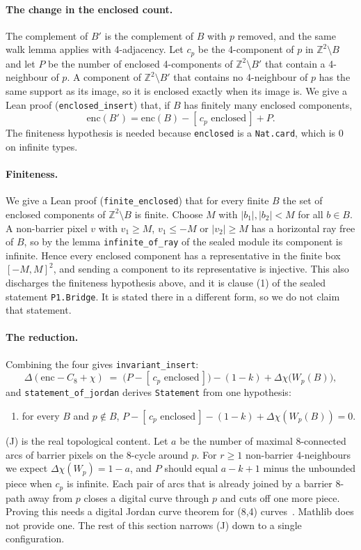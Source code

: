 \documentclass[11pt]{article}
\theoremstyle{definition}
\theoremstyle{remark}
\begin{document}
\paragraph{The change in the enclosed count.} The complement of $B'$ is the
complement of $B$ with $p$ removed, and the same walk lemma applies with
4-adjacency. Let $c_p$ be the 4-component of $p$ in $\mathbb{Z}^2\setminus B$ and
let $P$ be the number of enclosed 4-components of $\mathbb{Z}^2\setminus B'$ that
contain a 4-neighbour of $p$. A component of $\mathbb{Z}^2\setminus B'$ that
contains no 4-neighbour of $p$ has the same support as its image, so it is enclosed exactly
when its image is. We give a Lean proof (\texttt{enclosed\_insert}) that, if $B$ has finitely many enclosed
components,
\[
  \mathrm{enc}(B') = \mathrm{enc}(B) - [\,c_p \text{ enclosed}\,] + P .
\]
The finiteness hypothesis is needed because \texttt{enclosed} is a
\texttt{Nat.card}, which is $0$ on infinite types.

\paragraph{Finiteness.} We give a Lean proof (\texttt{finite\_enclosed}) that for every finite $B$
the set of enclosed components of $\mathbb{Z}^2\setminus B$ is finite. Choose
$M$ with $|b_1|,|b_2|<M$ for all $b\in B$. A non-barrier pixel $v$ with
$v_1\ge M$, $v_1\le -M$ or $|v_2|\ge M$ has a horizontal ray free of $B$, so by the
lemma \texttt{infinite\_of\_ray} of the sealed module its component is infinite.
Hence every enclosed component has a representative in the finite box
$[-M,M]^2$, and sending a component to its representative is injective. This also
discharges the finiteness hypothesis above, and it is clause (1) of the sealed
statement \texttt{P1.Bridge}. It is stated there in a different form, so we do
not claim that statement.

\paragraph{The reduction.} Combining the four gives \texttt{invariant\_insert}:
\[
  \Delta(\mathrm{enc}-C_8+\chi) \;=\; \bigl(P - [\,c_p\text{ enclosed}\,]\bigr) - (1-k)
  + \Delta\chi\bigl(W_p(B)\bigr),
\]
and \texttt{statement\_of\_jordan} derives \texttt{Statement} from one hypothesis:
\begin{enumerate}
\item[(J)] for every $B$ and $p\notin B$,
  $P - [\,c_p\text{ enclosed}\,] - (1-k) + \Delta\chi(W_p(B)) = 0$.
\end{enumerate}
(J) is the real topological content. Let $a$ be the number of
maximal 8-connected arcs of barrier pixels on the 8-cycle around $p$. For
$r\ge1$ non-barrier 4-neighbours we expect $\Delta\chi(W_p)=1-a$, and $P$ should
equal $a-k+1$ minus the unbounded piece when $c_p$ is infinite. Each pair of arcs that is
already joined by a barrier 8-path away from $p$ closes a digital curve through $p$
and cuts off one more piece. Proving this needs a digital Jordan curve theorem for
(8,4) curves~\cite{Rosenfeld1970}. Mathlib does not provide one. The rest of this section
narrows (J) down to a single configuration.
\end{document}
